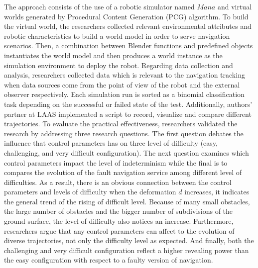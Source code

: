 \documentclass[10pt,a4paper]{report}
\begin{document}
The approach consists of the use of a robotic simulator named $Mana$ and virtual worlds generated by Procedural Content Generation (PCG) algorithm. 
%
To build the virtual world, the researchers collected relevant environmental attributes and robotic characteristics to build a world model in order to serve navigation scenarios.
%
Then, a combination between Blender functions and predefined objects instantiates the world model and then produces a world instance as the simulation environment to deploy the robot.
%
Regarding data collection and analysis, researchers collected data which is relevant to the navigation tracking when data sources come from the point of view of the robot and the external observer respectively.
%
Each simulation run is sorted as a binomial classification task depending on the successful or failed state of the test.
%
Additionally, authors' partner at LAAS implemented a script to record, visualize and compare different trajectories. 
%
To evaluate the practical effectiveness, researchers validated the research by addressing three research questions.
%
The first question debates the influence that control parameters has on three level of difficulty (easy, challenging, and very difficult configuration).
%
The next question examines which control parameters impact the level of indeterminism while the final is to compares the evolution of the fault navigation service among different level of difficulties.
%
As a result, there is an obvious connection between the control parameters and levels of difficulty when the deformation $d$ increases, it indicates the general trend of the rising of difficult level.
%
Because of many small obstacles, the large number of obstacles and the bigger number of subdivisions of the ground surface, the level of difficulty also notices an increase.
%
Furthermore, researchers argue that any control parameters can affect to the evolution of diverse trajectories, not only the difficulty level as expected.
%
And finally, both the challenging and very difficult configuration reflect a higher revealing power than the easy configuration with respect to a faulty version of navigation.
\end{document}
